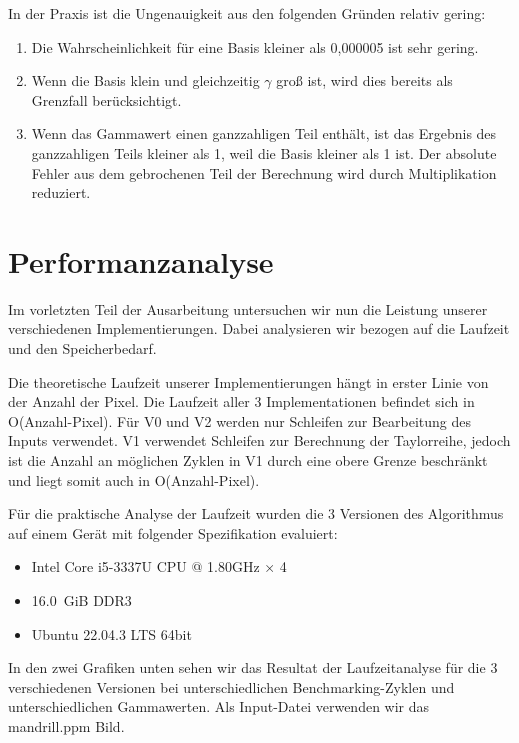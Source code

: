 \documentclass[course=erap]{aspdoc}
\begin{document}
\par
In der Praxis ist die Ungenauigkeit aus den folgenden Gründen relativ gering:
\begin{enumerate}
\item Die Wahrscheinlichkeit für eine Basis kleiner als 0,000005 ist sehr gering.
\item Wenn die Basis klein und gleichzeitig $\gamma$ groß ist, wird dies bereits als Grenzfall berücksichtigt.
\item Wenn das Gammawert einen ganzzahligen Teil enthält, ist das Ergebnis des ganzzahligen Teils kleiner als 1, weil die Basis kleiner als 1 ist. Der absolute Fehler aus dem gebrochenen Teil der Berechnung wird durch Multiplikation reduziert.
\end{enumerate}


\section{Performanzanalyse}
\par
Im vorletzten Teil der Ausarbeitung untersuchen wir nun die Leistung unserer verschiedenen Implementierungen. Dabei analysieren wir bezogen auf die Laufzeit und den Speicherbedarf.

\par
Die theoretische Laufzeit unserer Implementierungen hängt in erster Linie von der Anzahl der Pixel. Die Laufzeit aller 3 Implementationen befindet sich in O(Anzahl-Pixel). Für V0 und V2 werden nur Schleifen zur Bearbeitung des Inputs verwendet. V1 verwendet Schleifen zur Berechnung der Taylorreihe, jedoch ist die Anzahl an möglichen Zyklen in V1 durch eine obere Grenze beschränkt und liegt somit auch in O(Anzahl-Pixel).

\par
Für die praktische Analyse der Laufzeit wurden die 3 Versionen des Algorithmus auf einem Gerät mit folgender Spezifikation evaluiert:

\begin{itemize}
\item Intel Core i5-3337U CPU @ 1.80GHz × 4
\item 16.0 GiB DDR3
\item Ubuntu 22.04.3 LTS 64bit
\end{itemize}

\par
In den zwei Grafiken unten sehen wir das Resultat der Laufzeitanalyse für die 3 verschiedenen Versionen bei unterschiedlichen Benchmarking-Zyklen und unterschiedlichen Gammawerten. Als Input-Datei verwenden wir das mandrill.ppm Bild.
\end{document}
